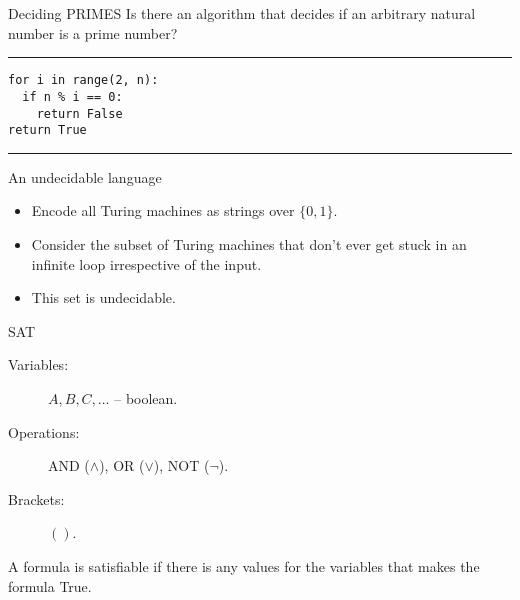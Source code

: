 \begin{frame}[fragile]{Deciding PRIMES}
  Is there an algorithm that decides if an arbitrary natural number is a prime number?


  \vspace{8mm}

  \hrule

  \begin{verbatim}
for i in range(2, n):
  if n % i == 0:
    return False
return True
  \end{verbatim}
  
  \hrule

   \vspace{8mm}


\end{frame}



\begin{frame}{An undecidable language}
  
  \begin{itemize}
    \setlength\itemsep{6mm}
    \item Encode all Turing machines as strings over $\{0, 1\}$.
    \item Consider the subset of Turing machines that don't ever get stuck in an infinite loop irrespective of the input.
    \item This set is undecidable.
  \end{itemize}

\end{frame}


\begin{frame}{SAT}
  

  \vspace{6mm}

  \begin{description}
    \item[Variables:] $A, B, C, \ldots$ -- boolean.
    \item[Operations:] AND ($\wedge$), OR ($\lor$), NOT ($\neg$).
    \item[Brackets:] $()$. 
  \end{description}

  \vspace{6mm}

  A formula is satisfiable if there is any values for the variables that makes the formula True.

  \vspace{6mm}


\end{frame}






